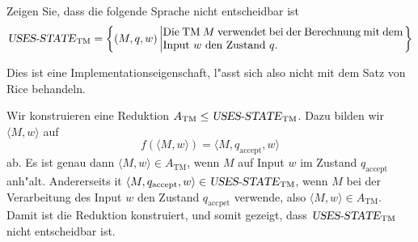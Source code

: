 Zeigen Sie, dass die folgende  Sprache nicht entscheidbar ist
\[
\text{\textsl{USES-STATE}}_{\text{TM}}=
\left\{
(M,q,w)\left|
\begin{minipage}{3truein}Die TM $M$ verwendet bei der Berechnung mit
dem Input $w$ den Zustand $q$.
\end{minipage}\right.
\right\}
\]

\begin{hinweis}
Dies ist eine Implementationseigenschaft, l"asst sich
also nicht mit dem Satz von Rice behandeln.
\end{hinweis}

\begin{loesung}
Wir konstruieren eine Reduktion
$A_{\text{TM}}\le \text{\textsl{USES-STATE}}_{\text{TM}}$.
Dazu bilden wir
$\langle M,w\rangle$
auf
\[
f(\langle M,w\rangle)=
\langle M,q_{\text{accept}},w\rangle
\]
ab. Es ist genau dann
$\langle M,w\rangle\in A_{\text{TM}}$, wenn $M$ auf Input $w$ im
Zustand $q_{\text{accept}}$ anh"alt. Andererseits it
$\langle M,q_{\text{accept}},w\rangle\in 
\text{\textsl{USES-STATE}}_{\text{TM}}$, wenn $M$ bei der Verarbeitung
des Input $w$ den Zustand $q_{\text{accpet}}$ verwende, also
$\langle M,w\rangle\in A_{\text{TM}}$. Damit ist die Reduktion
konstruiert, und somit gezeigt, dass
$\text{\textsl{USES-STATE}}_{\text{TM}}$ nicht entscheidbar ist.
\end{loesung}
